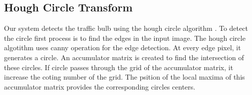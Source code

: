 \subsection{Hough Circle Transform}
Our system detects the traffic bulb using the hough circle algorithm \cite{houghcir_alg}.
To detect the circle first process is to find the edges in the input image.
The hough circle algotithm uses canny operation for the edge detection.
At every edge pixel, it generates a circle.
An accumulator matrix is created to find the intersection of these circles.
If circle passes through the grid of the accumulator matrix, it increase the coting number of the grid.
The psition of the local maxima of this accumulator matrix provides the corresponding circles centers.







